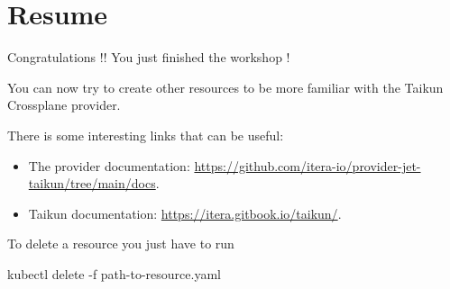 \section{Resume}\label{sec:resume}

Congratulations !! You just finished the workshop !

You can now try to create other resources to be more familiar with the Taikun Crossplane provider.

There is some interesting links that can be useful:
\begin{itemize}
    \item The provider documentation: \href{https://github.com/itera-io/provider-jet-taikun/tree/main/docs}{https://github.com/itera-io/provider-jet-taikun/tree/main/docs}.
    \item Taikun documentation: \href{https://itera.gitbook.io/taikun/}{https://itera.gitbook.io/taikun/}.
\end{itemize}

\begin{note}
To delete a resource you just have to run
\begin{shell}
kubectl delete -f path-to-resource.yaml
\end{shell}
\end{note}